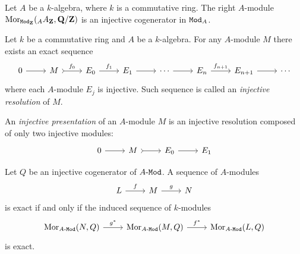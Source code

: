 \begin{proposition}
    \label{prop:every-cat-modA-has-inj-cogenerator}
    Let \(A\) be a \(k\)-algebra, where \(k\) is a commutative ring. The
    right \(A\)-module \(\operatorname{Mor}_{{\texttt{Mod}_{\mathbf{Z}}}}({}_AA_{\mathbf{Z}}, \mathbf{Q}/\mathbf{Z})\) is an injective cogenerator
    in \({\texttt{Mod}_{A}}\).
\end{proposition}

\begin{proposition}
    \label{prop:injective-resolution}
    Let \(k\) be a commutative ring and \(A\) be a \(k\)-algebra. For any
    \(A\)-module \(M\) there exists an exact sequence
    \[
        \begin{tikzcd}
            0 \ar[r]
            &M \ar[r, tail, "f_0"]
            &E_0 \ar[r, "f_1"]
            &E_1 \ar[r]
            &\cdots \ar[r]
            &E_n \ar[r, "f_{n+1}"]
            &E_{n+1} \ar[r]
            &\cdots
        \end{tikzcd}
    \]
    where each \(A\)-module \(E_j\) is injective. Such sequence is called an
    \emph{injective resolution} of \(M\).
\end{proposition}

\begin{definition}
    \label{def:injective-presentation}
    An \emph{injective presentation} of an \(A\)-module \(M\) is an injective
    resolution composed of only two injective modules:
    \[
        \begin{tikzcd}
            0 \ar[r] &M \ar[r, tail] &E_0 \ar[r] &E_1
        \end{tikzcd}
    \]
\end{definition}

\begin{lemma}
    \label{lem:exact-iff-induced-inj-cogenerator-hom-fct}
    Let \(Q\) be an injective cogenerator of \({A\text{-}\texttt{Mod}}\). A sequence of \(A\)-modules
    \[
        \begin{tikzcd}
            L \ar[r, "f"] &M \ar[r, "g"] &N
        \end{tikzcd}
    \]
    is exact if and only if the induced sequence of \(k\)-modules
    \[
        \begin{tikzcd}
            \Mor_{\Mod A}(N, Q) \ar[r, "g^{*}"]
            &\Mor_{\Mod A}(M, Q) \ar[r, "f^{*}"]
            &\Mor_{\Mod A}(L, Q)
        \end{tikzcd}
    \]
    is exact.
\end{lemma}

